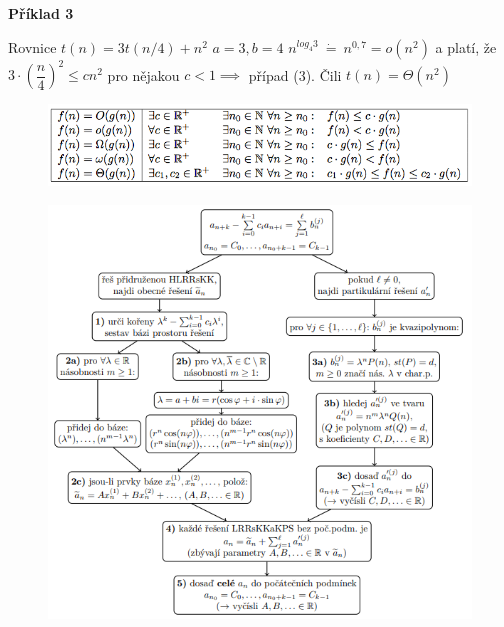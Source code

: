 \documentclass{szzclass}
\begin{document}
\textbf{Příklad 3}

Rovnice $t(n) = 3t(n/4) + n^2$\newline
$a = 3, b = 4$\newline
$n^{log_4 3}~\dot{=}~n^{0,7} = o(n^2)$ a platí, že $3 \cdot (\dfrac{n}{4})^2 \leq cn^2$ pro
nějakou $c < 1 \implies$ případ (3).\newline
Čili $t(n) = Θ(n^2)$



\begin{figure}[h]
    \includegraphics[width=\textwidth, center]{topics/bi-spol-32/images/slozitost.png}
\end{figure}


\begin{figure}[h]
    \includegraphics[width=1\textwidth, center]{topics/bi-spol-32/images/kuchar.PNG}
\end{figure}
\end{document}
